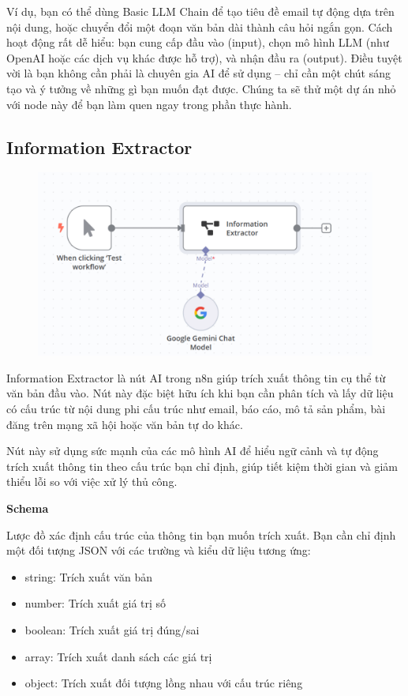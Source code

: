 Ví dụ, bạn có thể dùng Basic LLM Chain để tạo tiêu đề email tự động dựa trên nội dung, hoặc chuyển đổi một đoạn văn bản dài thành câu hỏi ngắn gọn. Cách hoạt động rất dễ hiểu: bạn cung cấp đầu vào (input), chọn mô hình LLM (như OpenAI hoặc các dịch vụ khác được hỗ trợ), và nhận đầu ra (output). Điều tuyệt vời là bạn không cần phải là chuyên gia AI để sử dụng – chỉ cần một chút sáng tạo và ý tưởng về những gì bạn muốn đạt được. Chúng ta sẽ thử một dự án nhỏ với node này để bạn làm quen ngay trong phần thực hành.
\subsection{Information Extractor}

\begin{figure}[htbp]
    \centering
    \includegraphics[width=1\linewidth]{Chap1-7/info_extract.pdf}
\end{figure}

Information Extractor là nút AI trong n8n giúp trích xuất thông tin cụ thể từ văn bản đầu vào. Nút này đặc biệt hữu ích khi bạn cần phân tích và lấy dữ liệu có cấu trúc từ nội dung phi cấu trúc như email, báo cáo, mô tả sản phẩm, bài đăng trên mạng xã hội hoặc văn bản tự do khác.

Nút này sử dụng sức mạnh của các mô hình AI để hiểu ngữ cảnh và tự động trích xuất thông tin theo cấu trúc bạn chỉ định, giúp tiết kiệm thời gian và giảm thiểu lỗi so với việc xử lý thủ công.


\textbf{Schema}

Lược đồ xác định cấu trúc của thông tin bạn muốn trích xuất. Bạn cần chỉ định một đối tượng JSON với các trường và kiểu dữ liệu tương ứng:

\begin{itemize}
    \item string: Trích xuất văn bản
    \item number: Trích xuất giá trị số
    \item boolean: Trích xuất giá trị đúng/sai
    \item array: Trích xuất danh sách các giá trị
    \item object: Trích xuất đối tượng lồng nhau với cấu trúc riêng
\end{itemize}

